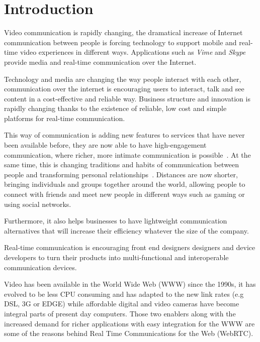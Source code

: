 \section{Introduction}

\thispagestyle{empty}

Video communication is rapidly changing, the dramatical increase of Internet communication between people is forcing technology to support mobile and real-time video experiences in different ways. Applications such as {\it Vime} and {\it Skype} provide media and real-time communication over the Internet. 

Technology and media are changing the way people interact with each other, communication over the internet is encouraging users to interact, talk and see content in a cost-effective and reliable way. Business structure and innovation is rapidly changing thanks to the existence of reliable, low cost and simple platforms for real-time communication.

This way of communication is adding new features to services that have never been available before, they are now able to have high-engagement communication, where richer, more intimate communication is possible~\cite{futureRTC}. At the same time, this is changing traditions and habits of communication between people and transforming personal relationships~\cite{socialrelationships}. Distances are now shorter, bringing individuals and groups together around the world, allowing people to connect with friends and meet new people in different ways such as gaming or using social networks.

Furthermore, it also helps businesses to have lightweight communication alternatives that will increase their efficiency whatever the size of the company. 

Real-time communication is encouraging front end designers designers and device developers to turn their products into multi-functional and interoperable communication devices.

Video has been available in the World Wide Web (WWW) since the 1990s, it has evolved to be less CPU consuming and has adapted to the new link rates (e.g DSL, 3G or EDGE) while affordable digital and video cameras have become integral parts of present day computers. Those two enablers along with the increased demand for richer applications with easy integration for the WWW are some of the reasons behind Real Time Communications for the Web (WebRTC).

